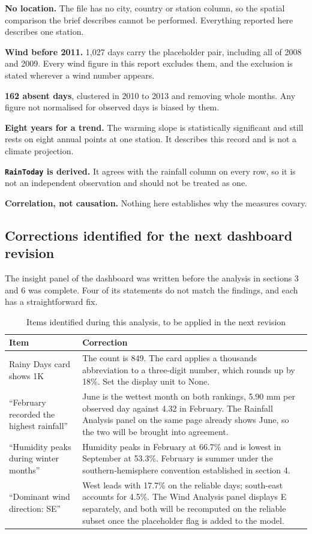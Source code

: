 \documentclass[12pt,a4paper]{article}
\newcommand{\F}[1]{\texttt{\small #1}}
\begin{document}
\textbf{No location.} The file has no city, country or station column, so the spatial
comparison the brief describes cannot be performed. Everything reported here
describes one station.

\textbf{Wind before 2011.} 1{,}027 days carry the placeholder pair, including all of
2008 and 2009. Every wind figure in this report excludes them, and the exclusion is
stated wherever a wind number appears.

\textbf{162 absent days}, clustered in 2010 to 2013 and removing whole months. Any
figure not normalised for observed days is biased by them.

\textbf{Eight years for a trend.} The warming slope is statistically significant and
still rests on eight annual points at one station. It describes this record and is not
a climate projection.

\textbf{\F{RainToday} is derived.} It agrees with the rainfall column on every row, so
it is not an independent observation and should not be treated as one.

\textbf{Correlation, not causation.} Nothing here establishes why the measures covary.

\subsection{Corrections identified for the next dashboard revision}

The insight panel of the dashboard was written before the analysis in sections 3 and 6
was complete. Four of its statements do not match the findings, and each has a
straightforward fix.

\begin{table}[htbp]\centering
\caption{Items identified during this analysis, to be applied in the next revision}
\small
\begin{tabularx}{\linewidth}{@{}l L@{}}
\toprule
\textbf{Item} & \textbf{Correction} \\
\midrule
Rainy Days card shows 1K &
The count is 849. The card applies a thousands abbreviation to a three-digit number,
which rounds up by 18\%. Set the display unit to None. \\[3pt]
``February recorded the highest rainfall'' &
June is the wettest month on both rankings, 5.90 mm per observed day against 4.32 in
February. The Rainfall Analysis panel on the same page already shows June, so the two
will be brought into agreement. \\[3pt]
``Humidity peaks during winter months'' &
Humidity peaks in February at 66.7\% and is lowest in September at 53.3\%. February is
summer under the southern-hemisphere convention established in section 4. \\[3pt]
``Dominant wind direction: SE'' &
West leads with 17.7\% on the reliable days; south-east accounts for 4.5\%. The Wind
Analysis panel displays E separately, and both will be recomputed on the reliable
subset once the placeholder flag is added to the model. \\
\bottomrule
\end{tabularx}
\end{table}
\end{document}

